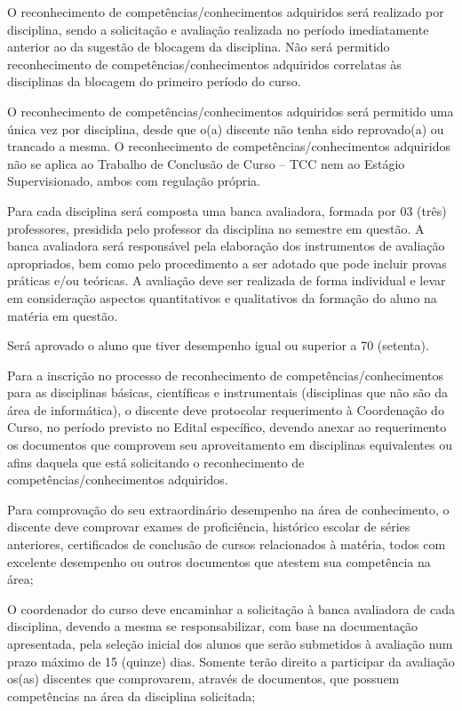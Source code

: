 	
	O reconhecimento de competências/conhecimentos adquiridos será realizado por disciplina, sendo a solicitação e avaliação realizada no período imediatamente anterior ao da sugestão de blocagem da disciplina. Não será permitido reconhecimento de competências/conhecimentos adquiridos correlatas às disciplinas da blocagem do primeiro período do curso.
	
	 O reconhecimento de competências/conhecimentos adquiridos será permitido uma única vez por disciplina, desde que o(a) discente não tenha sido reprovado(a) ou trancado a mesma. O reconhecimento de competências/conhecimentos adquiridos não se aplica ao Trabalho de Conclusão de Curso – TCC nem ao Estágio Supervisionado, ambos com regulação própria.
	
	Para cada disciplina será composta uma banca avaliadora, formada por 03 (três) professores, presidida pelo professor da disciplina no semestre em questão. A banca avaliadora será responsável pela elaboração dos instrumentos de avaliação apropriados, bem como pelo procedimento a ser adotado que pode incluir provas práticas e/ou teóricas. A avaliação deve ser realizada de forma individual e levar em consideração aspectos quantitativos e qualitativos da formação do aluno na matéria em questão.
	
	Será aprovado o aluno que tiver desempenho igual ou superior a 70 (setenta).
	
	Para a inscrição no processo de reconhecimento de competências/conhecimentos para as disciplinas básicas, científicas e instrumentais (disciplinas que não são da área de informática), o discente deve protocolar requerimento à Coordenação do Curso, no período previsto no Edital específico, devendo anexar ao requerimento os documentos que comprovem seu aproveitamento em disciplinas equivalentes ou afins daquela que está solicitando o reconhecimento de competências/conhecimentos adquiridos.
	
	Para comprovação do seu extraordinário desempenho na área de conhecimento, o discente deve comprovar exames de proficiência, histórico escolar de séries anteriores, certificados de conclusão de cursos relacionados à matéria, todos com excelente desempenho ou outros documentos que atestem sua competência na área;
	
	O coordenador do curso deve encaminhar a solicitação à banca avaliadora de cada disciplina, devendo a mesma se responsabilizar, com base na documentação apresentada, pela seleção inicial dos alunos que serão submetidos à avaliação num prazo máximo de 15 (quinze) dias. Somente terão direito a participar da avaliação os(as) discentes que comprovarem, através de documentos, que possuem competências na área da disciplina solicitada;

